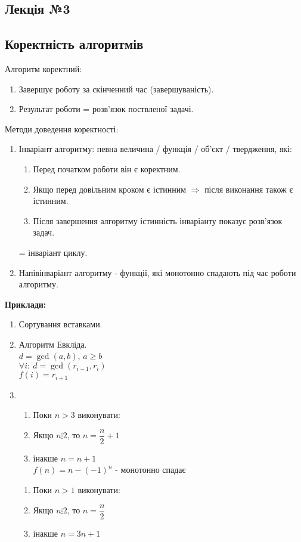 \documentclass[a4paper,12pt]{article}
\newcommand\tab[1][1cm]{\hspace*{#1}}
\begin{document}
\newpage
    \begin{center}
        \hrulefill
        \section{Лекція №3}
        \hrulefill
    \end{center}
    \subsection{Коректність алгоритмів}
    Алгоритм коректний:
    \begin{enumerate}
        \item Завершує роботу за скінченний час (завершуваність).
        \item Результат роботи = розв'язок поствленої задачі.
    \end{enumerate}
    Методи доведення коректності:
    \begin{enumerate}
        \item Інваріант алгоритму: певна величина / функція / об'єкт / твердження, які:
        \begin{enumerate}
            \item Перед початком роботи він є коректним. 
            \item Якщо перед довільним кроком є істинним $\Rightarrow$ після виконання також є істинним.
            \item Після завершення алгоритму істинність інваріанту показує розв'язок задач.
        \end{enumerate}
        = інваріант циклу.
        \item Напівінваріант алгоритму - функції, які монотонно спадають під час роботи алгоритму.
    \end{enumerate}
    \textbf{Приклади:}
    \begin{enumerate}
        \item Сортування вставками.
        \item Алгоритм Евкліда. \\
        $d=\gcd(a, b)$, $a\geqslant b$ \\
        $\forall i:\:d=\gcd(r_{i-1},r_i)$ \\
        $f(i)=r_{i+1}$
        \item 
        \begin{enumerate}
            \item Поки $n>3$ виконувати:
            \item \tab Якщо $n\vdots2$, то $n=\dfrac{n}{2}+1$
            \item \tab \tab інакше $n=n+1$ \\
            $f(n)=n-(-1)^n$ - монотонно спадає
        \end{enumerate}
        \begin{enumerate}
            \item Поки $n>1$ виконувати:
            \item \tab Якщо $n\vdots2$, то $n=\dfrac{n}{2}$
            \item \tab \tab інакше $n=3n+1$
        \end{enumerate}
    \end{enumerate}
    
\end{document}
